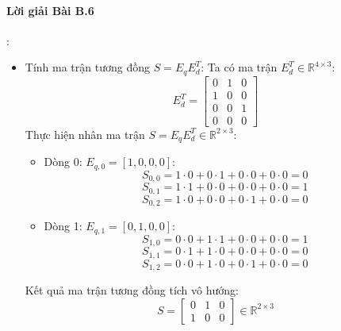 \paragraph{Lời giải Bài B.6}:
\begin{itemize}
  \item[a)] Tính ma trận tương đồng $S = E_q E_d^T$:
  Ta có ma trận $E_d^T \in \mathbb{R}^{4 \times 3}$:
  \begin{equation*}
  E_d^T = \begin{bmatrix} 0 & 1 & 0 \\ 1 & 0 & 0 \\ 0 & 0 & 1 \\ 0 & 0 & 0 \end{bmatrix}
  \end{equation*}
  Thực hiện nhân ma trận $S = E_q E_d^T \in \mathbb{R}^{2 \times 3}$:
  \begin{itemize}
    \item Dòng 0: $E_{q, 0} = [1, 0, 0, 0]$:
    \begin{equation*}
    S_{0, 0} = 1 \cdot 0 + 0 \cdot 1 + 0 \cdot 0 + 0 \cdot 0 = 0
    \end{equation*}
    \begin{equation*}
    S_{0, 1} = 1 \cdot 1 + 0 \cdot 0 + 0 \cdot 0 + 0 \cdot 0 = 1
    \end{equation*}
    \begin{equation*}
    S_{0, 2} = 1 \cdot 0 + 0 \cdot 0 + 0 \cdot 1 + 0 \cdot 0 = 0
    \end{equation*}
    \item Dòng 1: $E_{q, 1} = [0, 1, 0, 0]$:
    \begin{equation*}
    S_{1, 0} = 0 \cdot 0 + 1 \cdot 1 + 0 \cdot 0 + 0 \cdot 0 = 1
    \end{equation*}
    \begin{equation*}
    S_{1, 1} = 0 \cdot 1 + 1 \cdot 0 + 0 \cdot 0 + 0 \cdot 0 = 0
    \end{equation*}
    \begin{equation*}
    S_{1, 2} = 0 \cdot 0 + 1 \cdot 0 + 0 \cdot 1 + 0 \cdot 0 = 0
    \end{equation*}
  \end{itemize}
  Kết quả ma trận tương đồng tích vô hướng:
  \begin{equation*}
  S = \begin{bmatrix} 0 & 1 & 0 \\ 1 & 0 & 0 \end{bmatrix} \in \mathbb{R}^{2 \times 3}
  \end{equation*}


\end{itemize}
